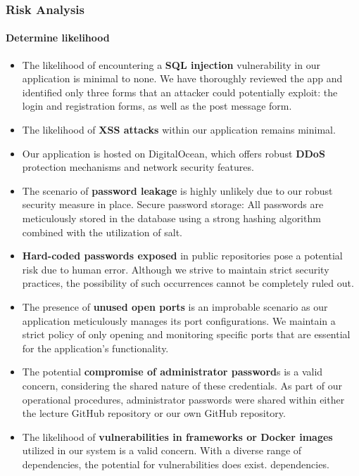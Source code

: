 \documentclass{article}
\begin{document}
	\subsubsection{Risk Analysis}
	\paragraph{Determine likelihood}
	\begin{itemize}
		\item The likelihood of encountering a \textbf{SQL injection} vulnerability in our application is minimal to none. We have thoroughly reviewed the app and identified only three forms that an attacker could potentially exploit: the login and registration forms, as well as the post message form. 
		\item The likelihood of \textbf{XSS attacks} within our application remains minimal.
		\item 	Our application is hosted on DigitalOcean, which offers robust \textbf{DDoS} protection mechanisms and network security features.
		\item The scenario of \textbf{password leakage} is highly unlikely due to our robust security measure in place. Secure password storage: All passwords are meticulously stored in the database using a strong hashing algorithm combined with the utilization of salt. 
		\item \textbf{Hard-coded passwords exposed} in public repositories pose a potential risk due to human error. Although we strive to maintain strict security practices, the possibility of such occurrences cannot be completely ruled out. 
		\item The presence of \textbf{unused open ports} is an improbable scenario as our application meticulously manages its port configurations. We maintain a strict policy of only opening and monitoring specific ports that are essential for the application's functionality.
		\item The potential \textbf{compromise of administrator password}s is a valid concern, considering the shared nature of these credentials. As part of our operational procedures, administrator passwords were shared within either the lecture GitHub repository or our own GitHub repository. 
		\item The likelihood of \textbf{vulnerabilities in frameworks or Docker images} utilized in our system is a valid concern. With a diverse range of dependencies, the potential for vulnerabilities does exist.  dependencies.
	\end{itemize}
\end{document}
